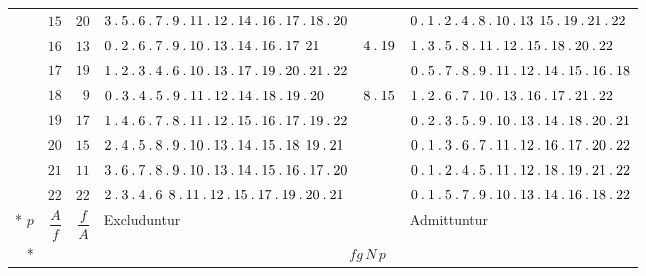 \begin{longtable}{r|r|r|p{125pt}|p{28pt}|p{125pt}}
 & $15$ & $20$ & $3\pdot 5\pdot 6\pdot 7\pdot 9\pdot 11\pdot 12\pdot 14\pdot 16\pdot 17\pdot 18\pdot 20$ &  & $0\pdot 1\pdot 2\pdot 4\pdot 8\pdot 10\pdot 13\mspace{8mu}15\pdot 19\pdot 21\pdot 22$\\
 & $16$ & $13$ & $0\pdot 2\pdot 6\pdot 7\pdot 9\pdot 10\pdot 13\pdot 14\pdot 16\pdot 17\mspace{8mu}21$ & $4\pdot 19$ & $1\pdot 3\pdot 5\pdot 8\pdot 11\pdot 12\pdot 15\pdot 18\pdot 20\pdot 22$\\
 & $17$ & $19$ & $1\pdot 2\pdot 3\pdot 4\pdot 6\pdot 10\pdot 13\pdot 17\pdot 19\pdot 20\pdot 21\pdot 22$ &  & $0\pdot 5\pdot 7\pdot 8\pdot 9\pdot 11\pdot 12\pdot 14\pdot 15\pdot 16\pdot 18$\\
 & $18$ & $9$ & $0\pdot 3\pdot 4\pdot 5\pdot 9\pdot 11\pdot 12\pdot 14\pdot 18\pdot 19\pdot 20$ & $8\pdot 15$ & $1\pdot 2\pdot 6\pdot 7\pdot 10\pdot 13\pdot 16\pdot 17\pdot 21\pdot 22$\\
 & $19$ & $17$ & $1\pdot 4\pdot 6\pdot 7\pdot 8\pdot 11\pdot 12\pdot 15\pdot 16\pdot 17\pdot 19\pdot 22$ &  & $0\pdot 2\pdot 3\pdot 5\pdot 9\pdot 10\pdot 13\pdot 14\pdot 18\pdot 20\pdot 21$\\
 & $20$ & $15$ & $2\pdot 4\pdot 5\pdot 8\pdot 9\pdot 10\pdot 13\pdot 14\pdot 15\pdot 18\mspace{8mu}19\pdot 21$ &  & $0\pdot 1\pdot 3\pdot 6\pdot 7\pdot 11\pdot 12\pdot 16\pdot 17\pdot 20\pdot 22$\\
 & $21$ & $11$ & $3\pdot 6\pdot 7\pdot 8\pdot 9\pdot 10\pdot 13\pdot 14\pdot 15\pdot 16\pdot 17\pdot 20$ &  & $0\pdot 1\pdot 2\pdot 4\pdot 5\pdot 11\pdot 12\pdot 18\pdot 19\pdot 21\pdot 22$\\
 & $22$ & $22$ & $2\pdot 3\pdot 4\pdot 6\mspace{8mu}8\pdot 11\pdot 12\pdot 15\pdot 17\pdot 19\pdot 20\pdot 21$ &  & $0\pdot 1\pdot 5\pdot 7\pdot 9\pdot 10\pdot 13\pdot 14\pdot 16\pdot 18\pdot 22$\\*
\hline
$p$ & $\dfrac{A}{f}$ & $\dfrac{f}{A}$ & Excluduntur & & Admittuntur\\*\cline{4-4}\cline{6-6}
& & & \multicolumn{3}{c}{$fg\,N\,p$}\\
\end{longtable}\endgroup

